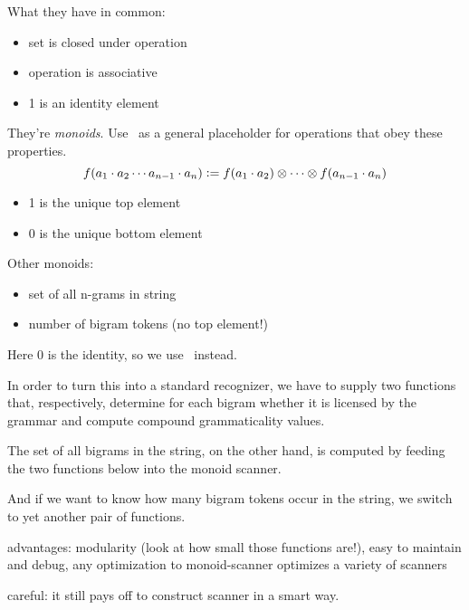 What they have in common:
%
\begin{itemize}
    \item set is closed under operation
    \item operation is associative
    \item 1 is an identity element
\end{itemize}
%
They're \emph{monoids}.
Use \semimult\ as a general placeholder for operations that obey these properties.
%
\[
    f(a_1 \cdot a_2 \cdots a_{n-1} \cdot a_n) \mathrel{\mathop:}=
        f(a_1 \cdot a_2) \otimes \cdots \otimes f(a_{n-1} \cdot a_n)
\]
%
\begin{itemize}
    \item 1 is the unique top element
    \item 0 is the unique bottom element
\end{itemize}
%
Other monoids:
%
\begin{itemize}
    \item set of all n-grams in string
    \item number of bigram tokens (no top element!)
\end{itemize}
%
Here 0 is the identity, so we use \semiadd\ instead.

\begin{center}
\end{center}
%
In order to turn this into a standard recognizer, we have to supply two functions that, respectively, determine for each bigram whether it is licensed by the grammar and compute compound grammaticality values.
%
\begin{center}
\end{center}
%
The set of all bigrams in the string, on the other hand, is computed by feeding the two functions below into the monoid scanner.
%
\begin{center}
\end{center}
%
And if we want to know how many bigram tokens occur in the string, we switch to yet another pair of functions.
%
\begin{center}
\end{center}

advantages: modularity (look at how small those functions are!), easy to maintain and debug, any optimization to monoid-scanner optimizes a variety of scanners

careful: it still pays off to construct scanner in a smart way.

\begin{center}
\end{center}

